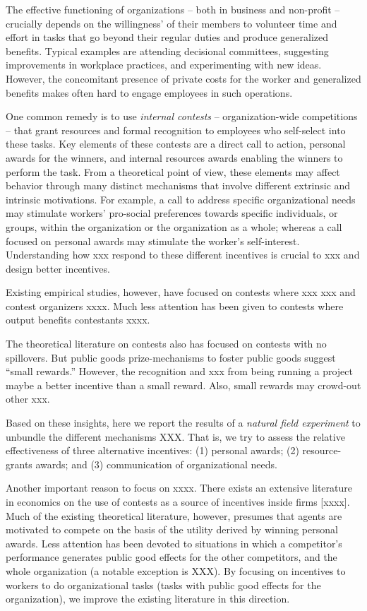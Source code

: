 \documentclass[12pt, titlepage]{article}
\begin{document}
The effective functioning of organizations -- both in business and
non-profit -- crucially depends on the willingness' of their members to
volunteer time and effort in tasks that go beyond their regular duties
and produce generalized benefits. Typical examples are attending
decisional committees, suggesting improvements in workplace practices,
and experimenting with new ideas. However, the concomitant presence of
private costs for the worker and generalized benefits makes often hard
to engage employees in such operations.

One common remedy is to use \emph{internal contests} --
organization-wide competitions -- that grant resources and formal
recognition to employees who self-select into these tasks. Key elements
of these contests are a direct call to action, personal awards for the
winners, and internal resources awards enabling the winners to perform
the task. From a theoretical point of view, these elements may affect
behavior through many distinct mechanisms that involve different
extrinsic and intrinsic motivations. For example, a call to address
specific organizational needs may stimulate workers' pro-social
preferences towards specific individuals, or groups, within the
organization or the organization as a whole; whereas a call focused on
personal awards may stimulate the worker's self-interest. Understanding
how xxx respond to these different incentives is crucial to xxx and
design better incentives.

Existing empirical studies, however, have focused on contests where xxx
xxx and contest organizers xxxx. Much less attention has been given to
contests where output benefits contestants xxxx.

The theoretical literature on contests also has focused on contests with
no spillovers. But public goods prize-mechanisms to foster public goods
suggest ``small rewards.'' However, the recognition and xxx from being
running a project maybe a better incentive than a small reward. Also,
small rewards may crowd-out other xxx.

Based on these insights, here we report the results of a \emph{natural
field experiment} to unbundle the different mechanisms XXX. That is, we
try to assess the relative effectiveness of three alternative
incentives: (1) personal awards; (2) resource-grants awards; and (3)
communication of organizational needs.

Another important reason to focus on xxxx. There exists an extensive
literature in economics on the use of contests as a source of incentives
inside firms {[}xxxx{]}. Much of the existing theoretical literature,
however, presumes that agents are motivated to compete on the basis of
the utility derived by winning personal awards. Less attention has been
devoted to situations in which a competitor's performance generates
public good effects for the other competitors, and the whole
organization (a notable exception is XXX). By focusing on incentives to
workers to do organizational tasks (tasks with public good effects for
the organization), we improve the existing literature in this direction.
\end{document}
